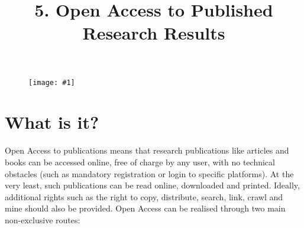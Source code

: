 \documentclass{article}
\newlength{\imgwidth}
\newcommand\scaledgraphics[2]{%
                
\settowidth{\imgwidth}{\texttt{[image: \#1]}}%
                
\setlength{\imgwidth}{\minof{\imgwidth}{#2\textwidth}}%
                
\texttt{[image: \#1]}%
                
}
\begin{document}
\title{5. Open Access to Published Research Results}

\maketitle

\begin{figure}
\scaledgraphics{cddc59fa-ec9b-4b21-bf7b-54c7b29924a1.png}{1}
\label{F81820871}
\end{figure}


\section{What is it?}\label{H3753285}



Open Access to publications means that research publications like articles and books can be accessed online, free of charge by any user, with no technical obstacles (such as mandatory registration or login to specific platforms). At the very least, such publications can be read online, downloaded and printed. Ideally, additional rights such as the right to copy, distribute, search, link, crawl and mine should also be provided. Open Access can be realised through two main non-exclusive routes:
\end{document}
